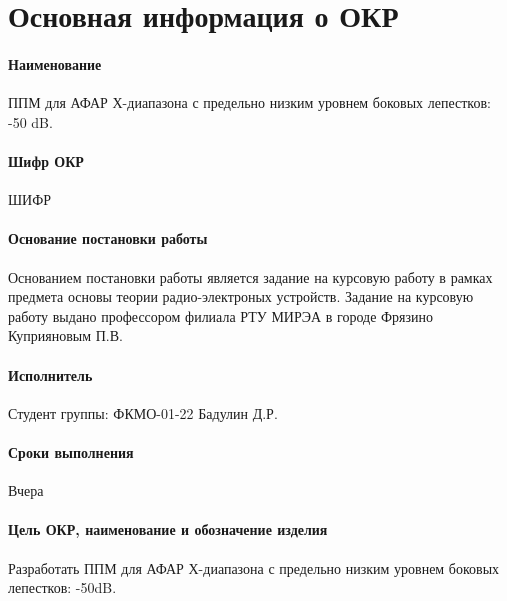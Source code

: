 \section{Основная информация о ОКР}


\paragraph{Наименование} ППМ для АФАР Х-диапазона с предельно низким уровнем боковых лепестков: -50 dB.


\paragraph{Шифр ОКР}


ШИФР




\paragraph{Основание постановки работы}

Основанием постановки работы является задание на курсовую работу в рамках предмета основы теории радио-электроных устройств. Задание на курсовую работу выдано профессором филиала РТУ МИРЭА в городе Фрязино Куприяновым П.В.




\paragraph{Исполнитель}

Студент группы: ФКМО-01-22 Бадулин Д.Р.



\paragraph{Сроки выполнения}

Вчера

\paragraph{Цель ОКР, наименование и обозначение изделия}

Разработать ППМ для АФАР Х-диапазона с предельно низким уровнем боковых лепестков: -50dB.

